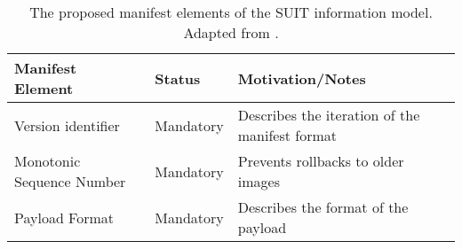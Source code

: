 \documentclass[0-thesis.tex]{subfiles}
\begin{document}
\begin{longtable}[]{@{}lll@{}}
    \caption{The proposed manifest elements of the SUIT information model. Adapted from \parencite{suit-information-model}.}
    \label{tab:manifest-elements}\\
    \toprule
    \begin{minipage}[b]{0.23\columnwidth}\raggedright\strut
    Manifest Element\strut
    \end{minipage} & \begin{minipage}[b]{0.26\columnwidth}\raggedright\strut
    Status\strut
    \end{minipage} & \begin{minipage}[b]{0.60\columnwidth}\raggedright\strut
    Motivation/Notes\strut
    \end{minipage}\tabularnewline
    \midrule
    \endhead
    \begin{minipage}[t]{0.23\columnwidth}\raggedright\strut
    Version identifier\strut
    \end{minipage} & \begin{minipage}[t]{0.26\columnwidth}\raggedright\strut
    Mandatory\strut
    \end{minipage} & \begin{minipage}[t]{0.60\columnwidth}\raggedright\strut
    Describes the iteration of the manifest format\strut
    \end{minipage}\tabularnewline
    \begin{minipage}[t]{0.23\columnwidth}\raggedright\strut
    Monotonic Sequence Number\strut
    \end{minipage} & \begin{minipage}[t]{0.26\columnwidth}\raggedright\strut
    Mandatory\strut
    \end{minipage} & \begin{minipage}[t]{0.60\columnwidth}\raggedright\strut
    Prevents rollbacks to older images\strut
    \end{minipage}\tabularnewline
    \begin{minipage}[t]{0.23\columnwidth}\raggedright\strut
    Payload Format\strut
    \end{minipage} & \begin{minipage}[t]{0.26\columnwidth}\raggedright\strut
    Mandatory\strut
    \end{minipage} & \begin{minipage}[t]{0.60\columnwidth}\raggedright\strut
    Describes the format of the payload\strut
    \end{minipage}\tabularnewline

\end{longtable}
\end{document}

